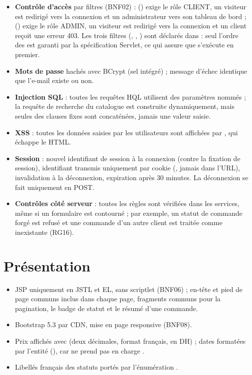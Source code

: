 \begin{itemize}
  \item \textbf{Contrôle d'accès} par filtres (BNF02) :  () exige le rôle CLIENT, un visiteur
        est redirigé vers la connexion et un administrateur vers son tableau de bord ;  ()
        exige le rôle ADMIN, un visiteur est redirigé vers la connexion et un client reçoit une erreur 403.
        Les trois filtres (, , ) sont déclarés dans  : seul
        l'ordre des  est garanti par la spécification Servlet, ce qui assure que
         s'exécute en premier.
  \item \textbf{Mots de passe} hachés avec BCrypt (sel intégré) ; message d'échec identique que l'e-mail existe ou non.
  \item \textbf{Injection SQL} : toutes les requêtes HQL utilisent des paramètres nommés ; la requête de recherche du
        catalogue est construite dynamiquement, mais seules des clauses fixes sont concaténées, jamais une valeur
        saisie.
  \item \textbf{XSS} : toutes les données saisies par les utilisateurs sont affichées par , qui échappe le HTML.
  \item \textbf{Session} : nouvel identifiant de session à la connexion (contre la fixation de session), identifiant
        transmis uniquement par cookie (, jamais dans l'URL), invalidation à la déconnexion,
        expiration après 30 minutes. La déconnexion se fait uniquement en POST.
  \item \textbf{Contrôles côté serveur} : toutes les règles sont vérifiées dans les services, même si un formulaire
        est contourné ; par exemple, un statut de commande forgé est refusé et une commande d'un autre client est
        traitée comme inexistante (RG16).
\end{itemize}

\section{Présentation}

\begin{itemize}
  \item JSP uniquement en JSTL et EL, sans scriptlet (BNF06) ; en-tête et pied de page communs inclus dans chaque
        page, fragments communs pour la pagination, le badge de statut et le résumé d'une commande.
  \item Bootstrap 5.3 par CDN, mise en page responsive (BNF08).
  \item Prix affichés avec  (deux décimales, format français, en DH) ; dates formatées par
        l'entité (), car  ne prend pas en charge .
  \item Libellés français des statuts portés par l'énumération .
\end{itemize}

